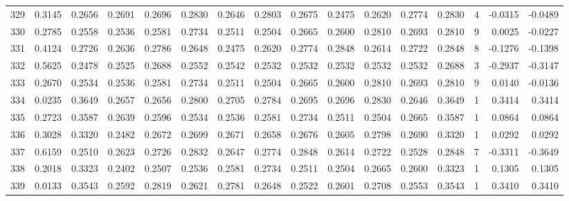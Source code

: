 \begin{tabular}{lrrrrrrrrrrrrrrr}
329 &      0.3145 &  0.2656 &  0.2691 &  0.2696 &  0.2830 &  0.2646 &  0.2803 &  0.2675 &  0.2475 &  0.2620 &   0.2774 &     0.2830 &      4 &                   -0.0315 &                    -0.0489 \\
330 &      0.2785 &  0.2558 &  0.2536 &  0.2581 &  0.2734 &  0.2511 &  0.2504 &  0.2665 &  0.2600 &  0.2810 &   0.2693 &     0.2810 &      9 &                    0.0025 &                    -0.0227 \\
331 &      0.4124 &  0.2726 &  0.2636 &  0.2786 &  0.2648 &  0.2475 &  0.2620 &  0.2774 &  0.2848 &  0.2614 &   0.2722 &     0.2848 &      8 &                   -0.1276 &                    -0.1398 \\
332 &      0.5625 &  0.2478 &  0.2525 &  0.2688 &  0.2552 &  0.2542 &  0.2532 &  0.2532 &  0.2532 &  0.2532 &   0.2532 &     0.2688 &      3 &                   -0.2937 &                    -0.3147 \\
333 &      0.2670 &  0.2534 &  0.2536 &  0.2581 &  0.2734 &  0.2511 &  0.2504 &  0.2665 &  0.2600 &  0.2810 &   0.2693 &     0.2810 &      9 &                    0.0140 &                    -0.0136 \\
334 &      0.0235 &  0.3649 &  0.2657 &  0.2656 &  0.2800 &  0.2705 &  0.2784 &  0.2695 &  0.2696 &  0.2830 &   0.2646 &     0.3649 &      1 &                    0.3414 &                     0.3414 \\
335 &      0.2723 &  0.3587 &  0.2639 &  0.2596 &  0.2534 &  0.2536 &  0.2581 &  0.2734 &  0.2511 &  0.2504 &   0.2665 &     0.3587 &      1 &                    0.0864 &                     0.0864 \\
336 &      0.3028 &  0.3320 &  0.2482 &  0.2672 &  0.2699 &  0.2671 &  0.2658 &  0.2676 &  0.2605 &  0.2798 &   0.2690 &     0.3320 &      1 &                    0.0292 &                     0.0292 \\
337 &      0.6159 &  0.2510 &  0.2623 &  0.2726 &  0.2832 &  0.2647 &  0.2774 &  0.2848 &  0.2614 &  0.2722 &   0.2528 &     0.2848 &      7 &                   -0.3311 &                    -0.3649 \\
338 &      0.2018 &  0.3323 &  0.2402 &  0.2507 &  0.2536 &  0.2581 &  0.2734 &  0.2511 &  0.2504 &  0.2665 &   0.2600 &     0.3323 &      1 &                    0.1305 &                     0.1305 \\
339 &      0.0133 &  0.3543 &  0.2592 &  0.2819 &  0.2621 &  0.2781 &  0.2648 &  0.2522 &  0.2601 &  0.2708 &   0.2553 &     0.3543 &      1 &                    0.3410 &                     0.3410 \\

\end{tabular}
